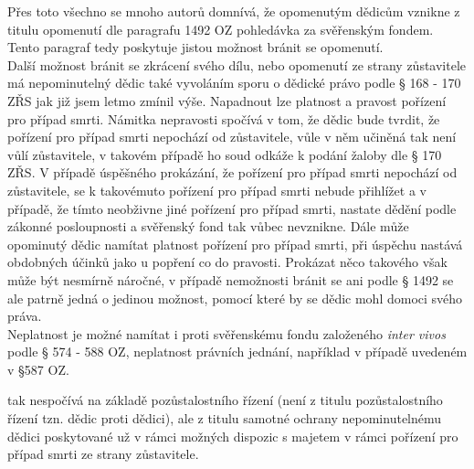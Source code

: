 \documentclass{article}
\begin{document}
  Přes toto všechno se mnoho autorů domnívá, že opomenutým dědicům vznikne z titulu opomenutí dle paragrafu 1492 OZ pohledávka za svěřenským fondem. Tento paragraf tedy poskytuje jistou možnost bránit se opomenutí.\\
  
  Další možnost bránit se zkrácení svého dílu, nebo opomenutí ze strany zůstavitele má nepominutelný dědic také vyvoláním sporu o dědické právo podle § 168 - 170 ZŘS jak již jsem letmo zmínil výše. Napadnout lze platnost a pravost pořízení pro případ smrti. Námitka nepravosti spočívá v tom, že dědic bude tvrdit, že pořízení pro případ smrti nepochází od zůstavitele, vůle v něm učiněná tak není vůlí zůstavitele, v takovém případě ho soud odkáže k podání žaloby dle § 170 ZŘS. V případě úspěšného prokázání, že pořízení pro případ smrti nepochází od zůstavitele, se k takovémuto pořízení pro případ smrti nebude přihlížet a v případě, že tímto neobživne jiné pořízení pro případ smrti, nastate dědění podle zákonné posloupnosti a svěřenský fond tak vůbec nevznikne. Dále může opominutý dědic namítat platnost pořízení pro případ smrti, při úspěchu nastává obdobných účinků jako u popření co do pravosti. Prokázat něco takového však může být nesmírně náročné, v případě nemožnosti bránit se ani podle § 1492 se ale patrně jedná o jedinou možnost, pomocí které by se dědic mohl domoci svého práva.\\
  
  Neplatnost je možné namítat i proti svěřenskému fondu založeného \textit{inter vivos} podle § 574 - 588 OZ, neplatnost právních jednání, například v případě uvedeném v §587 OZ.
  
 
 
 
 
  tak nespočívá na základě pozůstalostního řízení (není z titulu pozůstalostního řízení tzn. dědic proti dědici), ale z titulu samotné ochrany nepominutelnému dědici poskytované už v rámci možných dispozic s majetem v rámci pořízení pro případ smrti ze strany zůstavitele.
  
\end{document}
